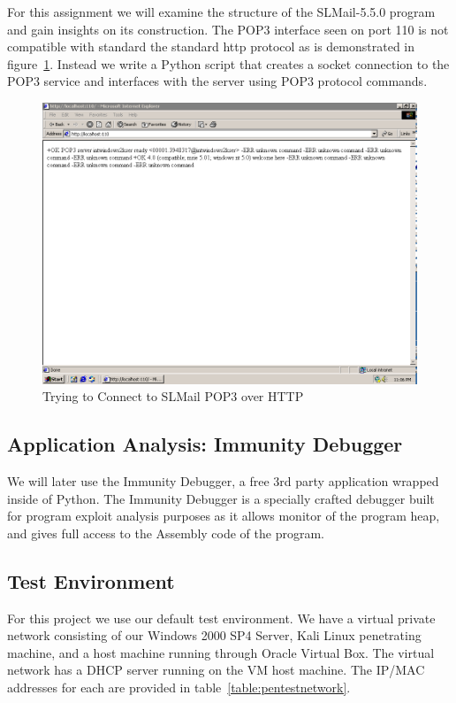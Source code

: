 \documentclass[12pt]{article}
\begin{document}
For this assignment we will examine the structure of the SLMail-5.5.0 
program and gain insights on its construction. The POP3 interface seen on 
port 110 is not compatible with standard the standard http protocol as is 
demonstrated in figure~\ref{fig:smailpop3http}. Instead we write a Python
script that creates a socket connection to the POP3 service and interfaces
with the server using POP3 protocol commands. 

\begin{figure}[ht]
    \centering
    \includegraphics[width=5.5in]{images/20160407_http_smail.png}
    \caption{Trying to Connect to SLMail POP3 over HTTP}
    \label{fig:smailpop3http}
\end{figure}

\subsection{Application Analysis: Immunity Debugger}
\label{sec:approachimmunity}

We will later use the Immunity Debugger, a free 3rd party application wrapped
inside of Python. The Immunity Debugger is a specially crafted debugger 
built for program exploit analysis purposes as it allows monitor of the 
program heap, and gives full access to the Assembly code of the program. 

\subsection{Test Environment}
\label{sec:testenv}
For this project we use our default test environment. We have a virtual 
private network consisting of our Windows 2000 SP4 Server, Kali Linux
penetrating machine, and a host machine running through Oracle Virtual Box. 
The virtual network has a DHCP server running on the VM host machine. The 
IP/MAC addresses for each are provided in table~\ref{table:pentestnetwork}.
\end{document}
